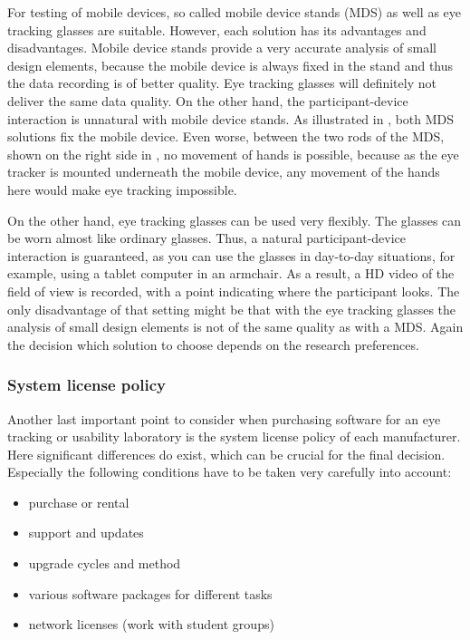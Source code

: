 \documentclass[output=paper]{langsci/langscibook}
\begin{document}
For testing of mobile devices, so called mobile device stands (MDS) as well as eye tracking glasses are suitable. However, each solution has its advantages and disadvantages. Mobile device stands provide a very accurate analysis of small design elements, because the mobile device is always fixed in the stand and thus the data recording is of better quality. Eye tracking glasses will definitely not deliver the same data quality. On the other hand, the participant-device interaction is unnatural with mobile device stands. As illustrated in , both MDS solutions fix the mobile device. Even worse, between the two rods of the MDS, shown on the right side in , no movement of hands is possible, because as the eye tracker is mounted underneath the mobile device, any movement of the hands here would make eye tracking impossible.


On the other hand, eye tracking glasses can be used very flexibly. The glasses can be worn almost like ordinary glasses. Thus, a natural participant-device interaction is guaranteed, as you can use the glasses in day-to-day situations, for example, using a tablet computer in an armchair. As a result, a HD video of the field of view is recorded, with a point indicating where the participant looks. The only disadvantage of that setting might be that with the eye tracking glasses the analysis of small design elements is not of the same quality as with a MDS. Again the decision which solution to choose depends on the research preferences.


\subsubsection{System license policy}

Another last important point to consider when purchasing software for an eye tracking or usability laboratory is the system license policy of each manufacturer. Here significant differences do exist, which can be crucial for the final decision. Especially the following conditions have to be taken very carefully into account:

\begin{itemize}
\item purchase or rental 
\item support and updates 
\item upgrade cycles and method 
\item various software packages for different tasks 
\item network licenses (work with student groups)
\end{itemize}
\end{document}
